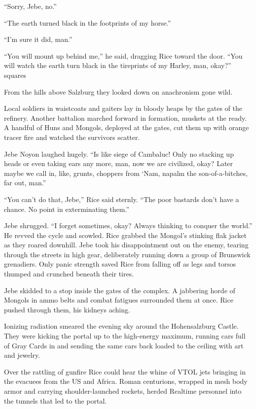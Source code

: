 “Sorry, Jebe, no.”

“The earth turned black in the footprints of my horse.”

“I’m sure it did, man.”

“You will mount up behind me,” he said, dragging Rice toward the door. “You will watch the earth turn black in the tireprints of my Harley, man, okay?”
squares

From the hills above Salzburg they looked down on anachronism gone wild.

Local soldiers in waistcoats and gaiters lay in bloody heaps by the gates of the refinery. Another battalion marched forward in formation, muskets at the ready. A handful of Huns and Mongols, deployed at the gates, cut them up with orange tracer fire and watched the survivors scatter.

Jebe Noyon laughed hugely. “Is like siege of Cambaluc! Only no stacking up heads or even taking ears any more, man, now we are civilized, okay? Later maybe we call in, like, grunts, choppers from ‘Nam, napalm the son-of-a-bitches, far out, man.”

“You can’t do that, Jebe,” Rice said sternly. “The poor bastards don’t have a chance. No point in exterminating them.”

Jebe shrugged. “I forget sometimes, okay? Always thinking to conquer the world.” He revved the cycle and scowled. Rice grabbed the Mongol’s stinking flak jacket as they roared downhill. Jebe took his disappointment out on the enemy, tearing through the streets in high gear, deliberately running down a group of Brunswick grenadiers. Only panic strength saved Rice from falling off as legs and torsos thumped and crunched beneath their tires.

Jebe skidded to a stop inside the gates of the complex. A jabbering horde of Mongols in ammo belts and combat fatigues surrounded them at once. Rice pushed through them, his kidneys aching.

Ionizing radiation smeared the evening sky around the Hohensalzburg Castle. They were kicking the portal up to the high-energy maximum, running cars full of Gray Cards in and sending the same cars back loaded to the ceiling with art and jewelry.

Over the rattling of gunfire Rice could hear the whine of VTOL jets bringing in the evacuees from the US and Africa. Roman centurions, wrapped in mesh body armor and carrying shoulder-launched rockets, herded Realtime personnel into the tunnels that led to the portal.

